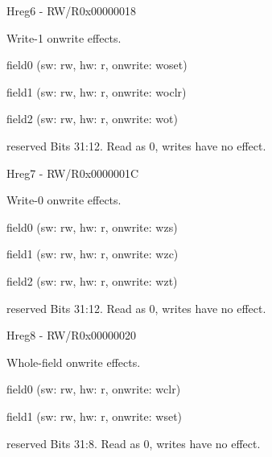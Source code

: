 \documentclass{article}
\begin{document}
\begin{register}{H}{reg6 - RW/R}{0x00000018}  \par Write-1 onwrite effects. \regnewline
  \label{reg6}
\regnewline
  \begin{regdesc}\begin{reglist}[field0]
    \item [field0] (sw: rw, hw: r, onwrite: woset)
    \item [field1] (sw: rw, hw: r, onwrite: woclr)
    \item [field2] (sw: rw, hw: r, onwrite: wot)
    \item [reserved] Bits 31:12. Read as 0, writes have no effect.
  \end{reglist}\end{regdesc}
\end{register}

\begin{register}{H}{reg7 - RW/R}{0x0000001C}  \par Write-0 onwrite effects. \regnewline
  \label{reg7}
\regnewline
  \begin{regdesc}\begin{reglist}[field0]
    \item [field0] (sw: rw, hw: r, onwrite: wzs)
    \item [field1] (sw: rw, hw: r, onwrite: wzc)
    \item [field2] (sw: rw, hw: r, onwrite: wzt)
    \item [reserved] Bits 31:12. Read as 0, writes have no effect.
  \end{reglist}\end{regdesc}
\end{register}

\begin{register}{H}{reg8 - RW/R}{0x00000020}  \par Whole-field onwrite effects. \regnewline
  \label{reg8}
\regnewline
  \begin{regdesc}\begin{reglist}[field0]
    \item [field0] (sw: rw, hw: r, onwrite: wclr)
    \item [field1] (sw: rw, hw: r, onwrite: wset)
    \item [reserved] Bits 31:8. Read as 0, writes have no effect.
  \end{reglist}\end{regdesc}
\end{register}
\end{document}
